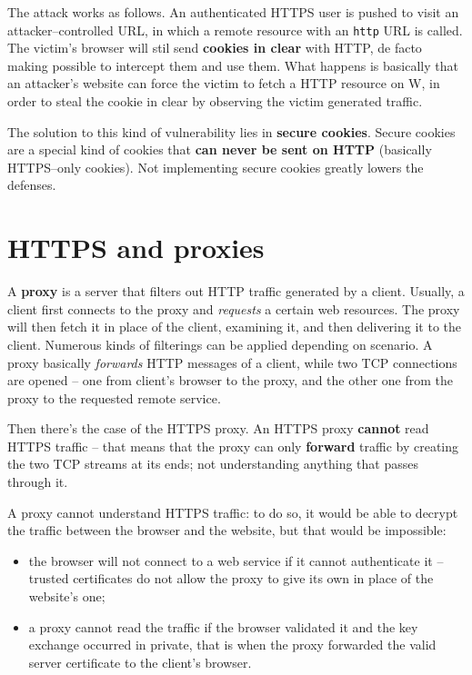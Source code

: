 \documentclass[10pt]{extbook}
\begin{document}
The attack works as follows. An authenticated HTTPS user is pushed to visit an
attacker--controlled URL, in which a remote resource with an \texttt{http} URL
is called. The victim's browser will stil send \textbf{cookies in clear} with
HTTP, de facto making possible to intercept them and use them. What happens is
basically that an attacker's website can force the victim to fetch a HTTP
resource on W, in order to steal the cookie in clear by observing the victim
generated traffic.

The solution to this kind of vulnerability lies in \textbf{secure cookies}.
Secure cookies are a special kind of cookies that \textbf{can never be sent on
HTTP} (basically HTTPS--only cookies). Not implementing secure cookies greatly
lowers the defenses.

\section{HTTPS and proxies}

A \textbf{proxy} is a server that filters out HTTP traffic generated by a
client. Usually, a client first connects to the proxy and \emph{requests} a
certain web resources. The proxy will then fetch it in place of the client,
examining it, and then delivering it to the client. Numerous kinds of
filterings can be applied depending on scenario. A proxy basically
\emph{forwards} HTTP messages of a client, while two TCP connections are opened
-- one from client's browser to the proxy, and the other one from the proxy to
the requested remote service.

Then there's the case of the HTTPS proxy. An HTTPS proxy \textbf{cannot} read
HTTPS traffic -- that means that the proxy can only \textbf{forward} traffic by
creating the two TCP streams at its ends; not understanding anything that
passes through it.

A proxy cannot understand HTTPS traffic: to do so, it would be able to decrypt
the traffic between the browser and the website, but that would be impossible:
\begin{itemize}
    \item the browser will not connect to a web service if it cannot
        authenticate it -- trusted certificates do not allow the proxy to give
        its own in place of the website's one;
    \item a proxy cannot read the traffic if the browser validated it and the
        key exchange occurred in private, that is when the proxy forwarded the
        valid server certificate to the client's browser.
\end{itemize}
\end{document}
